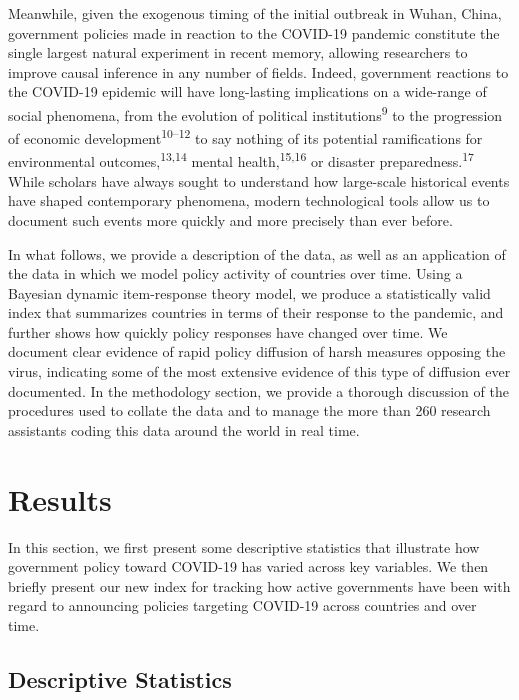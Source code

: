 \documentclass[
]{article}
\begin{document}
Meanwhile, given the exogenous timing of the initial outbreak in Wuhan, China, government policies made in reaction to the COVID-19 pandemic constitute the single largest natural experiment in recent memory, allowing researchers to improve causal inference in any number of fields. Indeed, government reactions to the COVID-19 epidemic will have long-lasting implications on a wide-range of social phenomena, from the evolution of political institutions\textsuperscript{9} to the progression of economic development\textsuperscript{10--12} to say nothing of its potential ramifications for environmental outcomes,\textsuperscript{13,14} mental health,\textsuperscript{15,16} or disaster preparedness.\textsuperscript{17} While scholars have always sought to understand how large-scale historical events have shaped contemporary phenomena, modern technological tools allow us to document such events more quickly and more precisely than ever before.

In what follows, we provide a description of the data, as well as an application of the data in which we model policy activity of countries over time. Using a Bayesian dynamic item-response theory model, we produce a statistically valid index that summarizes countries in terms of their response to the pandemic, and further shows how quickly policy responses have changed over time. We document clear evidence of rapid policy diffusion of harsh measures opposing the virus, indicating some of the most extensive evidence of this type of diffusion ever documented. In the methodology section, we provide a thorough discussion of the procedures used to collate the data and to manage the more than 260 research assistants coding this data around the world in real time.

\hypertarget{results}{%
\section*{Results}\label{results}}

In this section, we first present some descriptive statistics that illustrate how government policy toward COVID-19 has varied across key variables. We then briefly present our new index for tracking how active governments have been with regard to announcing policies targeting COVID-19 across countries and over time.

\hypertarget{descriptive-statistics}{%
\subsection*{Descriptive Statistics}\label{descriptive-statistics}}
\end{document}
